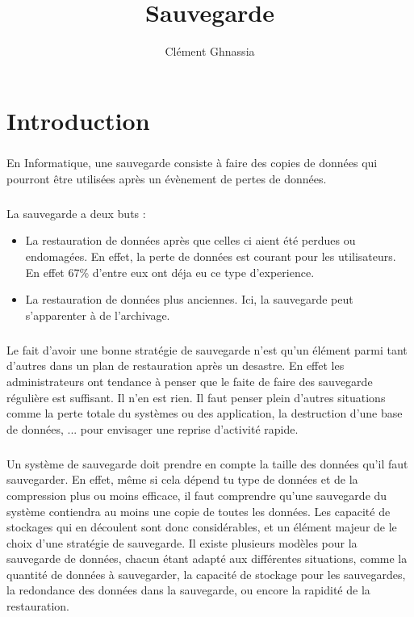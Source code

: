 \documentclass[a4paper,11pt]{report}
\title{Sauvegarde}
\author{Clément Ghnassia}
\begin{document}
\maketitle


\chapter{Introduction}

\paragraph{}
En Informatique, une sauvegarde consiste à faire des copies de données qui pourront être utilisées après un évènement de pertes de données.

\paragraph{}
La sauvegarde a deux buts :
\begin{itemize}
  \item La restauration de données après que celles ci aient été perdues ou endomagées. En effet, la perte de données est courant pour les utilisateurs. En effet 67\% d'entre eux ont déja eu ce type d'experience.
  \item La restauration de données plus anciennes. Ici, la sauvegarde peut s'apparenter à de l'archivage.
\end{itemize}

\paragraph{}
Le fait d'avoir une bonne stratégie de sauvegarde n'est qu'un élément parmi tant d'autres dans un plan de restauration après un desastre. En effet les administrateurs ont tendance à penser que le faite de faire des sauvegarde régulière est suffisant. Il n'en est rien.
Il faut penser plein d'autres situations comme la perte totale du systèmes ou des application, la destruction d'une base de données, ... pour envisager une reprise d'activité rapide.

\paragraph{}
Un système de sauvegarde doit prendre en compte la taille des données qu'il faut sauvegarder. En effet, même si cela dépend tu type de données et de la compression plus ou moins efficace, il faut comprendre qu'une sauvegarde du système contiendra au moins une copie de toutes les données.
Les capacité de stockages qui en découlent sont donc considérables, et un élément majeur de le choix d'une stratégie de sauvegarde.
Il existe plusieurs modèles pour la sauvegarde de données, chacun étant adapté aux différentes situations, comme la quantité de données à sauvegarder, la capacité de stockage pour les sauvegardes, la redondance des données dans la sauvegarde, ou encore la rapidité de la restauration.
\end{document}
